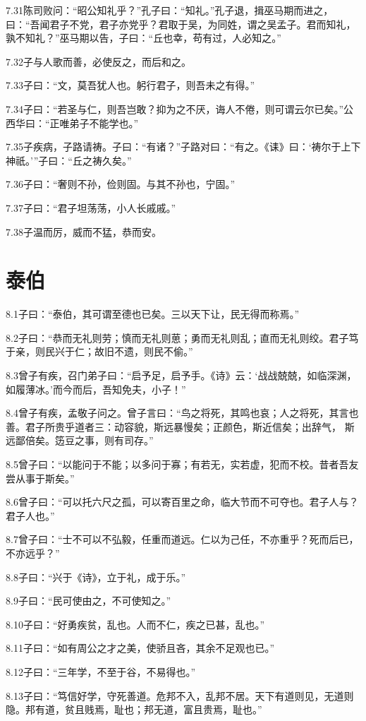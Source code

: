 \documentclass[a4paper,12pt,UTF8,twoside]{ctexbook}
\begin{document}
7.31陈司败问：“昭公知礼乎？”孔子曰：“知礼。”孔子退，揖巫马期而进之，曰：“吾闻君子不党，君子亦党乎？君取于吴，为同姓，谓之吴孟子。君而知礼，
孰不知礼？”巫马期以告，子曰：“丘也幸，苟有过，人必知之。”

7.32子与人歌而善，必使反之，而后和之。

7.33子曰：“文，莫吾犹人也。躬行君子，则吾未之有得。”

7.34子曰：“若圣与仁，则吾岂敢？抑为之不厌，诲人不倦，则可谓云尔已矣。”公西华曰：“正唯弟子不能学也。”

7.35子疾病，子路请祷。子曰：“有诸？”子路对曰：“有之。《诔》曰：‘祷尔于上下神祇。’”子曰：“丘之祷久矣。”

7.36子曰：“奢则不孙，俭则固。与其不孙也，宁固。”

7.37子曰：“君子坦荡荡，小人长戚戚。”

7.38子温而厉，威而不猛，恭而安。

\chapter{泰伯}
8.1子曰：“泰伯，其可谓至德也已矣。三以天下让，民无得而称焉。”

8.2子曰：“恭而无礼则劳；慎而无礼则葸；勇而无礼则乱；直而无礼则绞。君子笃于亲，则民兴于仁；故旧不遗，则民不偷。”

8.3曾子有疾，召门弟子曰：“启予足，启予手。《诗》云：‘战战兢兢，如临深渊，如履薄冰。’而今而后，吾知免夫，小子！”

8.4曾子有疾，孟敬子问之。曾子言曰：“鸟之将死，其鸣也哀；人之将死，其言也善。君子所贵乎道者三：动容貌，斯远暴慢矣；正颜色，斯近信矣；出辞气，
斯远鄙倍矣。笾豆之事，则有司存。”

8.5曾子曰：“以能问于不能；以多问于寡；有若无，实若虚，犯而不校。昔者吾友尝从事于斯矣。”

8.6曾子曰：“可以托六尺之孤，可以寄百里之命，临大节而不可夺也。君子人与？君子人也。”

8.7曾子曰：“士不可以不弘毅，任重而道远。仁以为己任，不亦重乎？死而后已，不亦远乎？”

8.8子曰：“兴于《诗》，立于礼，成于乐。”

8.9子曰：“民可使由之，不可使知之。”

8.10子曰：“好勇疾贫，乱也。人而不仁，疾之已甚，乱也。”

8.11子曰：“如有周公之才之美，使骄且吝，其余不足观也已。”

8.12子曰：“三年学，不至于谷，不易得也。”

8.13子曰：“笃信好学，守死善道。危邦不入，乱邦不居。天下有道则见，无道则隐。邦有道，贫且贱焉，耻也；邦无道，富且贵焉，耻也。”
\end{document}
